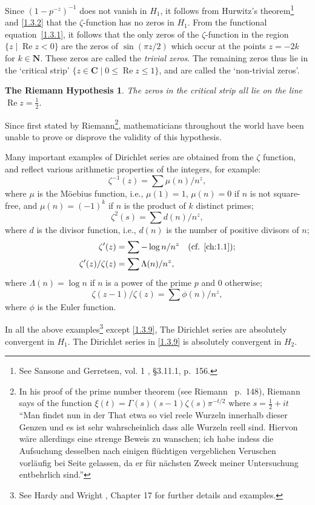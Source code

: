 \documentclass[10pt]{article}
\newtheorem{rh}[theo]{The Riemann Hypothesis}
\theoremstyle{definition}
\def\NN{\mathbf{N}}
\def\CC{\mathbf{C}}
\DeclareMathOperator{\re}{Re}
\def\qw#1{`#1'}
\def\fnonze{See Sansone and Gerretsen, vol. 1 \cite{bib:162}, \S3.11.1, p.~156.}
\def\fnonon{In his proof of the prime number theorem (see Riemann~\cite{bib:155} p.~148), Riemann says of the function $\xi(t) = \Gamma(s) (s-1) \zeta(s) \pi^{-t/2}$ where $s = \frac12 + it$ ``Man findet nun in der That etwa so viel reele Wurzeln innerhalb dieser Genzen und es ist sehr wahrscheinlich dass alle Wurzeln reell sind. Hiervon w\"are allerdings eine strenge Beweis zu wanschen; ich habe indess die Aufsuchung desselben nach einigen fl\"uchtigen vergeblichen Veruschen vorl\"aufig bei Seite gelassen, da er f\"ur n\"achsten Zweck meiner Untersuchung entbehrlich sind.''}
\def\fnontw{See Hardy and Wright \cite{bib:86}, Chapter 17 for further details and examples.}
\begin{document}
Since $(1-p^{-z})^{-1}$ does not vanish in $H_1$, it follows from Hurwitz's theorem\footnote{\fnonze} and \ref{1.3.2} that the $\zeta$-function has no zeros in $H_1$.
From the functional equation~\eqref{1.3.1}, it follows that the only zeros of the $\zeta$-function in the region $\{ z \mid \re z < 0 \}$ are the zeros of $\sin(\pi z / 2)$ which occur at the points $z = -2k$ for $k \in \NN$.
These zeros are called the \emph{trivial zeros}.
The remaining zeros thus lie in the \qw{critical strip} $\{z \in \CC \mid 0 \leq \re z \leq 1 \}$, and are called the \qw{non-trivial zeros}.


\begin{rh}
\label{1.3.4}
The zeros in the critical strip all lie on the line $\re z = \frac12$.
\end{rh}


Since first stated by Riemann\footnote{\fnonon}, mathematicians throughout the world have been unable to prove or disprove the validity of this hypothesis.

Many important examples of Dirichlet series are obtained from the $\zeta$ function, and reflect various arithmetic properties of the integers, for example:
\begin{equation}
\label{1.3.5}
\zeta^{-1}(z) = \sum \mu(n) / n^z,
\end{equation}
where $\mu$ is the M\"oebius function, i.e., $\mu(1) = 1$, $\mu(n) = 0$ if $n$ is not square-free, and $\mu(n) = (-1)^k$ if $n$ is the product of $k$ distinct primes;
\begin{equation}
\label{1.3.6}
\zeta^2(s) = \sum d(n) / n^z,
\end{equation}
where $d$ is the divisor function, i.e., $d(n)$ is the number of positive divisors of $n$;
\begin{align}
\label{1.3.7}
\zeta'(z) &= \sum -\log n / n^z
\quad\text{(cf. \ref{ch:1.1})};
\\
\label{1.3.8}
\zeta'(z) / \zeta(z) &= \sum \Lambda(n) / n^z,
\end{align}
where $\Lambda(n) = \log n$ if $n$ is a power of the prime $p$ and $0$ otherwise;
\begin{equation}
\label{1.3.9}
\zeta(z-1)/\zeta(z) = \sum \phi(n) / n^z,
\end{equation}
where $\phi$ is the Euler function.

In all the above examples\footnote{\fnontw} except \eqref{1.3.9}, The Dirichlet series are absolutely convergent in $H_1$.
The Dirichlet series in \eqref{1.3.9} is absolutely convergent in $H_2$.
\end{document}
